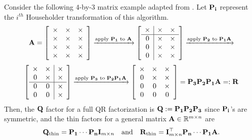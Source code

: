Consider the following $4$-by-$3$ matrix example adapted from \cite{Higham2002}. 
Let $\mathbf{P_i}$ represent the $i^{th}$ Householder transformation of this algorithm. 
\[\mathbf{A} = \left[ \begin{array}{ccc}
\times & \times & \times \\
\times & \times & \times \\
\times & \times & \times \\
\times & \times & \times
\end{array}
\right]\xrightarrow{\text{apply $\mathbf{P_1}$ to $\mathbf{A}$}}\left[ \begin{array}{c|cc}
\times & \times & \times \\ \hline
0 & \times & \times \\
0 & \times & \times \\
0 & \times & \times
\end{array}
\right]
\xrightarrow{\text{apply $\mathbf{P_2}$ to $\mathbf{P_1}\mathbf{A}$}}\]
\[ \left[
\begin{array}{cc|c}
\times & \times & \times \\
0 & \times & \times \\ \hline
0 & 0 & \times \\
0 & 0 & \times 
\end{array} \right]
\xrightarrow{\text{apply $\mathbf{P_3}$ to $\mathbf{P_2}\mathbf{P_1}\mathbf{A}$}} \left[ \begin{array}{ccc}
\times & \times & \times \\
0 & \times & \times \\
0 & 0 & \times \\
0 & 0 & 0 
\end{array}\right] = \mathbf{P_3}\mathbf{P_2}\mathbf{P_1}\mathbf{A}=:\mathbf{R} \] 
Then, the $\mathbf{Q}$ factor for a full QR factorization is $\mathbf{Q}:=\mathbf{P_1}\mathbf{P_2}\mathbf{P_3}$ since $\mathbf{P_i}$'s are symmetric, and the thin factors for a general matrix $\mathbf{A}\in\mathbb{R}^{m\times n}$ are
\begin{equation}
\mathbf{Q}_{\text{thin}} = \mathbf{P_1} \cdots \mathbf{P_n}\mathbf{I}_{m\times n}\quad \text{and} \quad \mathbf{R}_{\text{thin}} = \mathbf{I}_{m\times n}^{\top}\mathbf{P_n}\cdots \mathbf{P_1}\mathbf{A}.
\end{equation}

